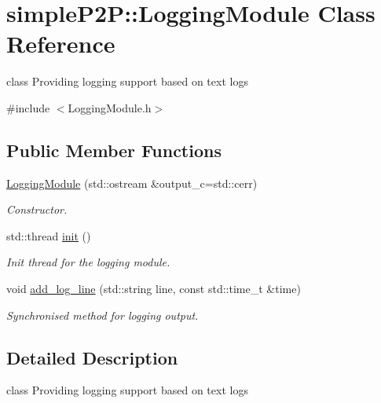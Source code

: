 \hypertarget{classsimpleP2P_1_1LoggingModule}{}\section{simple\+P2P\+:\+:Logging\+Module Class Reference}
\label{classsimpleP2P_1_1LoggingModule}


class Providing logging support based on text logs  




{\ttfamily \#include $<$Logging\+Module.\+h$>$}

\subsection*{Public Member Functions}
\begin{DoxyCompactItemize}
\item 
\hyperlink{classsimpleP2P_1_1LoggingModule_abdd131c9caa8d9472a1a60a3d3f72be1}{Logging\+Module} (std\+::ostream \&output\+\_\+c=std\+::cerr)
\begin{DoxyCompactList}\small\item\em Constructor. \end{DoxyCompactList}\item 
\mbox{\label{classsimpleP2P_1_1LoggingModule_af9d95113f09de5817fbca07114ea6aa2}} 
std\+::thread \hyperlink{classsimpleP2P_1_1LoggingModule_af9d95113f09de5817fbca07114ea6aa2}{init} ()
\begin{DoxyCompactList}\small\item\em Init thread for the logging module. \end{DoxyCompactList}\item 
void \hyperlink{classsimpleP2P_1_1LoggingModule_ac251f998da1ac3e7fb7452012a024d46}{add\+\_\+log\+\_\+line} (std\+::string line, const std\+::time\+\_\+t \&time)
\begin{DoxyCompactList}\small\item\em Synchronised method for logging output. \end{DoxyCompactList}\end{DoxyCompactItemize}


\subsection{Detailed Description}
class Providing logging support based on text logs 

